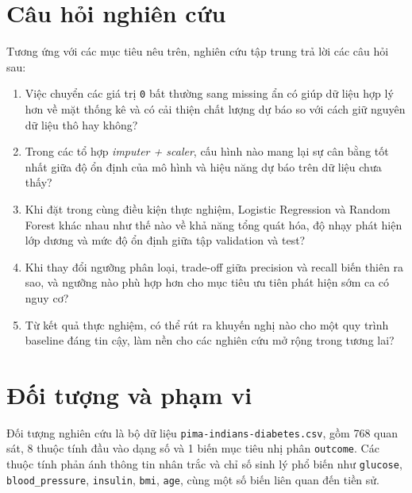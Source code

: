 \section{Câu hỏi nghiên cứu}
Tương ứng với các mục tiêu nêu trên, nghiên cứu tập trung trả lời các câu hỏi sau:
\begin{enumerate}[leftmargin=1.8em]
    \item Việc chuyển các giá trị \texttt{0} bất thường sang missing ẩn có giúp dữ liệu hợp lý hơn về mặt thống kê
    và có cải thiện chất lượng dự báo so với cách giữ nguyên dữ liệu thô hay không?

    \item Trong các tổ hợp \textit{imputer + scaler}, cấu hình nào mang lại sự cân bằng tốt nhất giữa độ ổn định của mô hình
    và hiệu năng dự báo trên dữ liệu chưa thấy?

    \item Khi đặt trong cùng điều kiện thực nghiệm, Logistic Regression và Random Forest khác nhau như thế nào về khả năng
    tổng quát hóa, độ nhạy phát hiện lớp dương và mức độ ổn định giữa tập validation và test?

    \item Khi thay đổi ngưỡng phân loại, trade-off giữa precision và recall biến thiên ra sao, và ngưỡng nào phù hợp hơn
    cho mục tiêu ưu tiên phát hiện sớm ca có nguy cơ?

    \item Từ kết quả thực nghiệm, có thể rút ra khuyến nghị nào cho một quy trình baseline đáng tin cậy, làm nền cho các
    nghiên cứu mở rộng trong tương lai?
\end{enumerate}

\section{Đối tượng và phạm vi}
Đối tượng nghiên cứu là bộ dữ liệu \texttt{pima-indians-diabetes.csv}, gồm 768 quan sát, 8 thuộc tính đầu vào dạng số và
1 biến mục tiêu nhị phân \texttt{outcome}. Các thuộc tính phản ánh thông tin nhân trắc và chỉ số sinh lý phổ biến như
\texttt{glucose}, \texttt{blood\_pressure}, \texttt{insulin}, \texttt{bmi}, \texttt{age}, cùng một số biến liên quan đến tiền sử.

